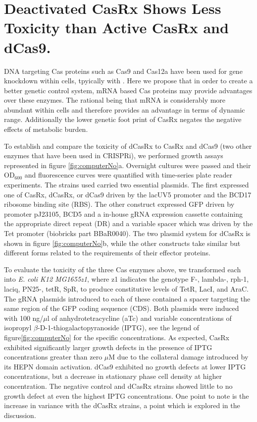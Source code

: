 \documentclass[times]{zHenriquesLab-StyleBioRxiv}
\begin{document}
\section*{Deactivated CasRx Shows Less Toxicity than Active CasRx and dCas9.}
 DNA targeting Cas proteins such as Cas9 and Cas12a have been used for gene knockdown within cells, tpyically with  . Here we propose that in order to create a better genetic control system, mRNA based Cas proteins may provide advantages over these enzymes. The rational being that mRNA is considerably more abundant within cells and therefore provides an advantage in terms of dynamic range. Additionally the lower genetic foot print of CasRx negates the negative effects of metabolic burden.

To establish and compare the toxicity of dCasRx to CasRx and dCas9 (two other enzymes that have been used in CRISPRi), we performed growth assays represented in figure \ref{fig:computerNo}a. Overnight cultures were passed and their OD$_{600}$ and fluorescence curves were quantified with time-series plate reader experiments. The strains used carried two essential plasmids. The first expressed one of CasRx, dCasRx, or dCas9 driven by the lacUV5 promoter and the BCD17\textsuperscript{\cite{Mutalik:2013aa}} ribosome binding site (RBS). The other construct expressed GFP driven by promoter pJ23105, BCD5 \textsuperscript{\cite{Mutalik:2013aa}} and a in-house gRNA expression cassette containing the appropriate direct repeat (DR) and a variable spacer which was driven by the Tet promoter (biobricks part BBaR0040). The two plasmid system for dCasRx is shown in figure \ref{fig:computerNo}b, while the other constructs take similar but different forms related to the requirements of their effector proteins.

To evaluate the toxicity of the three Cas enzymes above, we transformed each into {\it E. coli K12 MG1655z1}, where z1 indicates the genotype F-, lambda-, rph-1, laciq, PN25-, tetR, SpR, to produce constitutive levels of TetR, LacI, and AraC\textsuperscript{\cite{Sekar:2016aa}}. The gRNA plasmids introduced to each of these contained a spacer targeting the same region of the GFP coding sequence (CDS). Both plasmids were induced with 100 ng/$\mu$l of anhydrotetracycline (aTc) and variable concentrations of isopropyl $\beta$-D-1-thiogalactopyranoside (IPTG), see the legend of figure\ref{fig:computerNo} for the specific concentrations. As expected, CasRx exhibited significantly larger growth defects in the presence of IPTG concentrations greater than zero $\mu$M due to the collateral damage introduced by its HEPN domain activation. dCas9 exhibited no growth defects at lower IPTG concentrations, but a decrease in stationary phase cell density at higher concentration. The negative control and dCasRx strains showed little to no growth defect at even the highest IPTG concentrations. One point to note is the increase in variance with the dCasRx strains, a point which is explored in the discussion.
\end{document}
